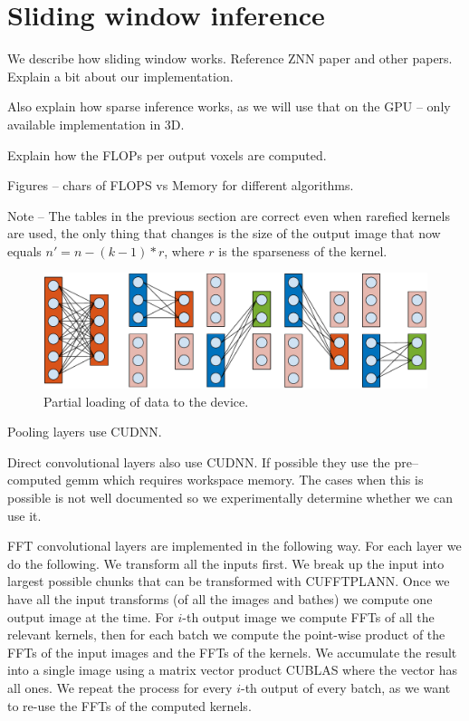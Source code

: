 \documentclass[conference]{IEEEtran}
\begin{document}
\section{Sliding window inference}

We describe how sliding window works.  Reference ZNN paper and other
papers.  Explain a bit about our implementation.

Also explain how sparse inference works, as we will use that on the
GPU -- only available implementation in 3D.

Explain how the FLOPs per output voxels are computed.

Figures -- chars of FLOPS vs Memory for different algorithms.

Note -- The tables in the previous section are correct even when
rarefied kernels are used, the only thing that changes is the size of
the output image that now equals $n' = n - (k-1)*r$, where $r$ is the
sparseness of the kernel.



\begin{figure}
  \begin{center}
  \includegraphics[width=0.95\columnwidth]{fig/gpuram.pdf}
  \end{center}
  \caption{Partial loading of data to the device.}
  \label{fig:partial_exec}
\end{figure}

Pooling layers use CUDNN.

Direct convolutional layers also use CUDNN.  If possible they use the
pre--computed gemm which requires workspace memory.  The cases when
this is possible is not well documented so we experimentally determine
whether we can use it.

FFT convolutional layers are implemented in the following way.  For
each layer we do the following.  We transform all the inputs first.
We break up the input into largest possible chunks that can be
transformed with CUFFTPLANN.  Once we have all the input transforms
(of all the images and bathes) we compute one output image at the
time.  For $i$-th output image we compute FFTs of all the relevant
kernels, then for each batch we compute the point-wise product of the
FFTs of the input images and the FFTs of the kernels.  We accumulate
the result into a single image using a matrix vector product CUBLAS
where the vector has all ones.  We repeat the process for every $i$-th
output of every batch, as we want to re-use the FFTs of the computed
kernels.
\end{document}
